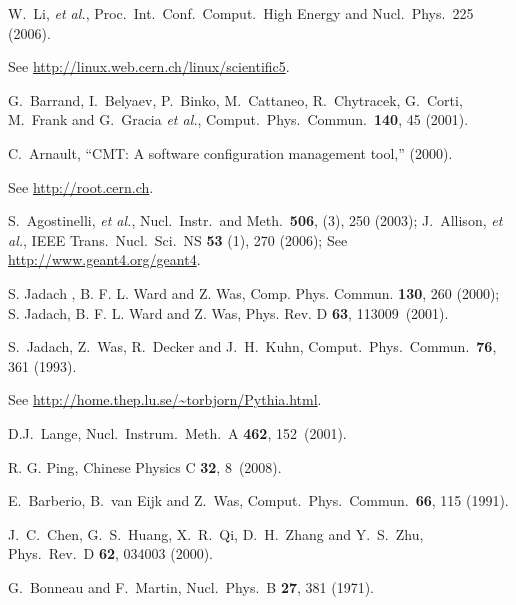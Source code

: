 \begin{thebibliography}{99}
  W.~Li, {\it et al.},
  Proc.\ Int.\ Conf.\ Comput.\ High Energy and Nucl.\ Phys.\ 225 (2006).

  See \url{http://linux.web.cern.ch/linux/scientific5}.

  G.~Barrand, I.~Belyaev, P.~Binko, M.~Cattaneo, R.~Chytracek, G.~Corti, M.~Frank and G.~Gracia {\it et al.},
  Comput.\ Phys.\ Commun.\  {\bf 140}, 45 (2001).

  C.~Arnault, ``CMT: A software configuration management tool,'' (2000).

  See \url{http://root.cern.ch}.

  S.~Agostinelli, {\it et al.}, Nucl.\ Instr.\ and Meth.\ {\bf 506}, (3), 250 (2003);
  J.~Allison, {\it et al.}, IEEE Trans.\ Nucl.\ Sci.\ NS {\bf 53} (1), 270 (2006);
  See \url{http://www.geant4.org/geant4}.

 S. Jadach , B. F. L. Ward and Z. Was,
  Comp. Phys. Commun. {\bf 130}, 260 (2000); S. Jadach, B. F. L. Ward
  and  Z. Was, Phys. Rev. D {\bf 63}, 113009~(2001).

  S.~Jadach, Z.~Was, R.~Decker and J.~H.~Kuhn,
  Comput.\ Phys.\ Commun.\  {\bf 76}, 361 (1993).

  See \url{http://home.thep.lu.se/\~torbjorn/Pythia.html}.

  D.J.~Lange,
  Nucl.\ Instrum.\ Meth.\ A {\bf 462},
  152~(2001).

  R. G. Ping, Chinese Physics C {\bf 32}, 8~(2008).

  E.~Barberio, B.~van Eijk and Z.~Was,
  Comput.\ Phys.\ Commun.\  {\bf 66}, 115 (1991).

  J.~C.~Chen, G.~S.~Huang, X.~R.~Qi, D.~H.~Zhang and Y.~S.~Zhu,
  Phys.\ Rev.\ D {\bf 62}, 034003 (2000).

  G.~Bonneau and F.~Martin,
  Nucl.\ Phys.\ B {\bf 27}, 381 (1971).


\end{thebibliography}
